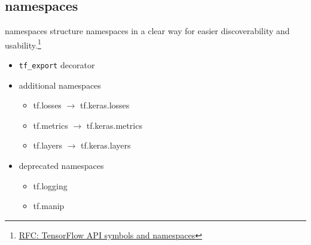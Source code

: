 
\subsection{namespaces}

\begin{frame}{namespaces}
    structure namespaces in a clear way for easier discoverability and usability.\footnote{\href{https://github.com/tensorflow/community/pull/16}{RFC: TensorFlow API symbols and namespaces}}

    \begin{itemize}
        \item \lstinline{tf_export} decorator
        \item additional namespaces
            \begin{itemize}
                \item tf.losses $\to$ tf.keras.losses
                \item tf.metrics $\to$ tf.keras.metrics
                \item tf.layers $\to$ tf.keras.layers
            \end{itemize}
        \item deprecated namespaces
            \begin{itemize}
                \item tf.logging
                \item tf.manip
            \end{itemize}
    \end{itemize}
\end{frame}
